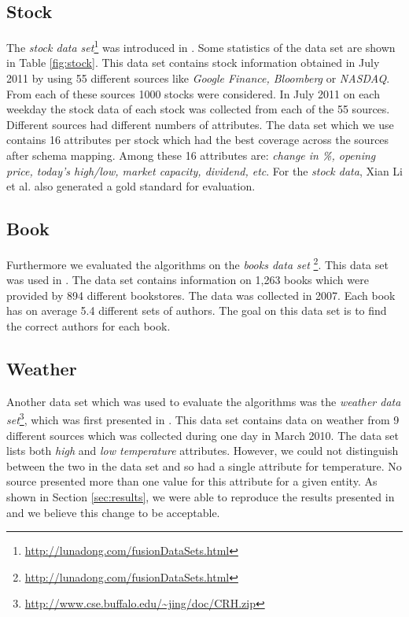 \documentclass{acm_proc_article-sp}
\begin{document}
\subsection{Stock}

The \emph{stock data set}\footnote{\url{http://lunadong.com/fusionDataSets.html}} was introduced in \cite{li:truth}. Some statistics of the data set are shown in Table \ref{fig:stock}. This data set contains stock information obtained in July 2011 by using 55 different sources like \emph{Google Finance, Bloomberg} or \emph{NASDAQ}. From each of these sources 1000 stocks were considered. In July 2011 on each weekday the stock data of each stock was collected from each of the 55 sources. Different sources had different numbers of attributes. The data set which we use contains 16 attributes per stock which had the best coverage across the sources after schema mapping. Among these 16 attributes are: \emph{change in \%, opening price, today's high/low, market capacity, dividend, etc}. For the \emph{stock data}, {Xian Li et al.} \cite{li:truth} also generated a gold standard for evaluation.

\subsection{Book}

Furthermore we evaluated the algorithms on the \emph{books data set} \footnote{\url{http://lunadong.com/fusionDataSets.html}}. This data set was used in \cite{yin:truth}. The data set contains information on 1,263 books which were provided by 894 different bookstores. The data was collected in 2007. Each book has on average 5.4 different sets of authors. The goal on this data set is to find the correct authors for each book.

\subsection{Weather}

Another data set which was used to evaluate the algorithms was the \emph{weather data set}\footnote{\url{http://www.cse.buffalo.edu/~jing/doc/CRH.zip}}, which was first presented in \cite{li:resolving}. This data set contains data on weather from 9 different sources which was collected during one day in March 2010. The data set lists both \emph{high} and \emph{low temperature} attributes. However, we could not distinguish between the two in the data set and so had a single attribute for temperature. No source presented more than one value for this attribute for a given entity. As shown in Section \ref{sec:results}, we were able to reproduce the results presented in \cite{li:resolving} and we believe this change to be acceptable. 
\end{document}
